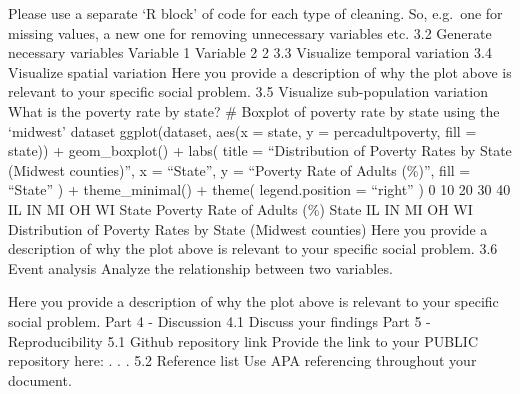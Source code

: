 \documentclass[
]{article}
\begin{document}
Please use a separate `R block' of code for each type of cleaning. So,
e.g.~one for missing values, a new one for removing unnecessary
variables etc. 3.2 Generate necessary variables Variable 1 Variable 2 2
3.3 Visualize temporal variation 3.4 Visualize spatial variation Here
you provide a description of why the plot above is relevant to your
specific social problem. 3.5 Visualize sub-population variation What is
the poverty rate by state? \# Boxplot of poverty rate by state using the
`midwest' dataset ggplot(dataset, aes(x = state, y = percadultpoverty,
fill = state)) + geom\_boxplot() + labs( title = ``Distribution of
Poverty Rates by State (Midwest counties)'', x = ``State'', y =
``Poverty Rate of Adults (\%)'', fill = ``State'' ) + theme\_minimal() +
theme( legend.position = ``right'' ) 0 10 20 30 40 IL IN MI OH WI State
Poverty Rate of Adults (\%) State IL IN MI OH WI Distribution of Poverty
Rates by State (Midwest counties) Here you provide a description of why
the plot above is relevant to your specific social problem. 3.6 Event
analysis Analyze the relationship between two variables.

Here you provide a description of why the plot above is relevant to your
specific social problem. Part 4 - Discussion 4.1 Discuss your findings
Part 5 - Reproducibility 5.1 Github repository link Provide the link to
your PUBLIC repository here: . . . 5.2 Reference list Use APA
referencing throughout your document.
\end{document}
